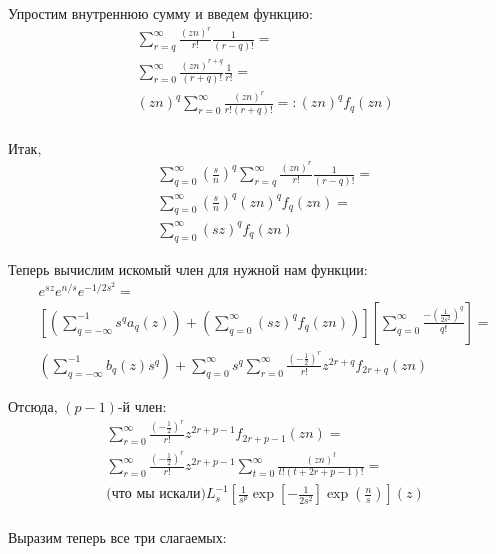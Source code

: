 \documentclass[a4paper, fleqn]{report}
\begin{document}
Упростим внутреннюю сумму и введем функцию:
\begin{align*}
    & \sum_{r=q}^{\infty} \frac{\left(zn\right)^r}{r!} \frac{1}{(r-q)!} = \\
    & \sum_{r=0}^{\infty} \frac{\left(zn\right)^{r+q}}{(r+q)!} \frac{1}{r!} = \\
    & (zn)^q \sum_{r=0}^{\infty} \frac{\left(zn\right)^{r}}{r!(r+q)!} =: (zn)^q f_q(zn) \\
\end{align*}

Итак,
\begin{align*}
    & \sum_{q=0}^{\infty} \left(\frac{s}{n}\right)^q \sum_{r=q}^{\infty} \frac{\left(zn\right)^r}{r!} \frac{1}{(r-q)!} = \\
    & \sum_{q=0}^{\infty} \left(\frac{s}{n}\right)^q (zn)^q f_q(zn) = \\
    & \sum_{q=0}^{\infty} (sz)^q f_q(zn)
\end{align*}

Теперь вычислим искомый член для нужной нам функции:
\begin{align*}
    & e^{sz} e^{n / s} e^{-1 / 2s^2} = \\
    & \left[ \left(\sum_{q=-\infty}^{-1} s^q a_q(z)\right) + \left( \sum_{q=0}^{\infty} (sz)^q f_q(zn) \right)  \right] \left[ \sum_{q=0}^{\infty} \frac{-\left( \frac{1}{2s^2} \right)^q}{q!}  \right] = \\
    & \left(\sum_{q=-\infty}^{-1} b_q(z) s^q\right) + \sum_{q=0}^{\infty} s^q \sum_{r=0}^{\infty} \frac{\left( -\frac{1}{2} \right)^r}{r!} z^{2r+q} f_{2r+q}(zn)
\end{align*}

Отсюда, $(p-1)$-й член:
\begin{align*}
    & \sum_{r=0}^{\infty} \frac{\left( -\frac{1}{2} \right)^r}{r!} z^{2r+p-1} f_{2r+p-1}(zn) = \\
    & \sum_{r=0}^{\infty} \frac{\left( -\frac{1}{2} \right)^r}{r!} z^{2r+p-1} \sum_{t=0}^{\infty} \frac{\left(zn\right)^{t}}{t!(t+2r+p-1)!} = \\
    & \text{(что мы искали)} L^{-1}_s \left[ \frac{1}{s^p} \exp \left[ -\frac{1}{2 s^2} \right] \exp \left( \frac{n}{s} \right)  \right](z) \\
\end{align*}

Выразим теперь все три слагаемых:
\end{document}
